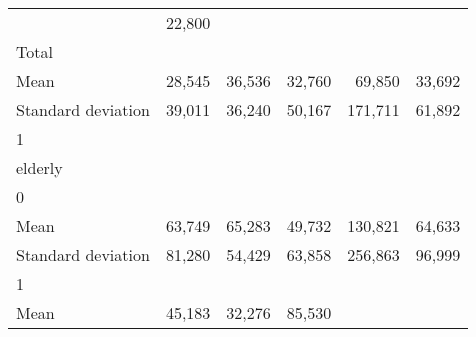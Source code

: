 \begin{tabular}{llllll}
  \multicolumn{1}{r}{} &
  \multicolumn{1}{r}{22,800} \\
\multicolumn{1}{l}{\hspace{3em}Total} &
  \multicolumn{1}{|r}{} &
  \multicolumn{1}{r}{} &
  \multicolumn{1}{r}{} &
  \multicolumn{1}{r}{} &
  \multicolumn{1}{r}{} \\
\multicolumn{1}{l}{\hspace{4em}Mean} &
  \multicolumn{1}{|r}{28,545} &
  \multicolumn{1}{r}{36,536} &
  \multicolumn{1}{r}{32,760} &
  \multicolumn{1}{r}{69,850} &
  \multicolumn{1}{r}{33,692} \\
\multicolumn{1}{l}{\hspace{4em}Standard deviation} &
  \multicolumn{1}{|r}{39,011} &
  \multicolumn{1}{r}{36,240} &
  \multicolumn{1}{r}{50,167} &
  \multicolumn{1}{r}{171,711} &
  \multicolumn{1}{r}{61,892} \\
\multicolumn{1}{l}{\hspace{1em}1} &
  \multicolumn{1}{|r}{} &
  \multicolumn{1}{r}{} &
  \multicolumn{1}{r}{} &
  \multicolumn{1}{r}{} &
  \multicolumn{1}{r}{} \\
\multicolumn{1}{l}{\hspace{2em}elderly} &
  \multicolumn{1}{|r}{} &
  \multicolumn{1}{r}{} &
  \multicolumn{1}{r}{} &
  \multicolumn{1}{r}{} &
  \multicolumn{1}{r}{} \\
\multicolumn{1}{l}{\hspace{3em}0} &
  \multicolumn{1}{|r}{} &
  \multicolumn{1}{r}{} &
  \multicolumn{1}{r}{} &
  \multicolumn{1}{r}{} &
  \multicolumn{1}{r}{} \\
\multicolumn{1}{l}{\hspace{4em}Mean} &
  \multicolumn{1}{|r}{63,749} &
  \multicolumn{1}{r}{65,283} &
  \multicolumn{1}{r}{49,732} &
  \multicolumn{1}{r}{130,821} &
  \multicolumn{1}{r}{64,633} \\
\multicolumn{1}{l}{\hspace{4em}Standard deviation} &
  \multicolumn{1}{|r}{81,280} &
  \multicolumn{1}{r}{54,429} &
  \multicolumn{1}{r}{63,858} &
  \multicolumn{1}{r}{256,863} &
  \multicolumn{1}{r}{96,999} \\
\multicolumn{1}{l}{\hspace{3em}1} &
  \multicolumn{1}{|r}{} &
  \multicolumn{1}{r}{} &
  \multicolumn{1}{r}{} &
  \multicolumn{1}{r}{} &
  \multicolumn{1}{r}{} \\
\multicolumn{1}{l}{\hspace{4em}Mean} &
  \multicolumn{1}{|r}{45,183} &
  \multicolumn{1}{r}{32,276} &
  \multicolumn{1}{r}{85,530} &

\end{tabular}
